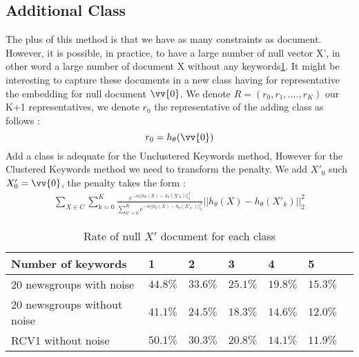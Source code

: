 \subsection{Additional Class}
The plus of this method is that we have as many constraints as document. 
However, it is possible, in practice, to have a large number of null vector X', 
in other word a large number of  document X without any keywords\ref{table:null_prime}.
It might be interesting to capture these documents in a new class having
for representative the embedding for null document $\vv{0}$. We denote    
$R=(r_0, r_1, ...., r_K)$ our K+1 representatives, we denote 
$r_0$ the representative of the adding class as follows : 
\begin{equation}
r_0 = h_\theta(\vv{0})
\end{equation}
Add a class is adequate for the Unclustered Keywords method, However for the
Clustered Keywords method we need to transform the penalty.  
We add $X'_0$ such $X'_0 = \vv{0}$, the penalty takes the form :
\begin{equation}\label{eq:k_add}
\begin{array}{l}
  \sum\limits_{X \in C} \sum\limits_{k = 0}^K \frac{e^{-\alpha|| h_\theta(X) - 
h_\theta(X'_k)||_2^2}}{\sum\limits_{k' = 0}^K e^{-\alpha|| h_\theta(X) - 
h_\theta(X'_{k'})||_2^2}}|| h_\theta(X) - h_\theta(X'_{k})||_2^2
\end{array}
\end{equation}
\begin{table}[h]
\centering
\caption{\label{table:null_prime}Rate of null $X'$ document for each class}
  \begin{tabular}{|l|l|l|l|l|l|l|}
    \hline
     Number of keywords         & 1      &2       & 3      & 4      & 5\\ \hline
     20 newsgroups with noise   &$44.8\%$&$33.6\%$&$25.1\%$&$19.8\%$&$15.3\%$ \\ \hline
     20 newsgroups without noise&$41.1\%$&$24.5\%$&$18.3\%$&$14.6\%$&$12.0\%$ \\ \hline
     RCV1 without noise         &$50.1\%$&$30.3\%$&$20.8\%$&$14.1\%$&$11.9\%$ \\ \hline
  \end{tabular}
\end{table}
